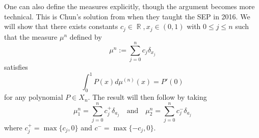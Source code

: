 \documentclass[answers]{exam}
\DeclareMathOperator{\RR}{\mathbb{R}}
\begin{document}
\begin{questions}
\begin{parts}
\begin{solution}
	One can also define the measures explicitly, though the argument becomes more technical. This is Chun's solution from when they taught the SEP in 2016. We will show that there exists constants $c_{j} \in \RR, x_{j}\in (0,1)$ with $0\leq j\leq n$ such that the measure $\mu^{n}$ defined by
  \begin{equation}\label{eq:mu-form}
    \mu^{n}:= \sum_{j=0}^{n}c_{j}\delta_{x_{j}}
  \end{equation}
  satisfies
  \[ \int_0^1 P(x) d\mu^{(n)}(x) = P'(0) \]
  for any polynomial $P \in X_n$. The result will then follow by taking
  \begin{equation*}
    \mu_{1}^{n} = \sum_{j=0}^{n}c_{j}^{+}\delta_{a_{j}} \quad \text{and}\quad    \mu_{2}^{n} = \sum_{j=0}^{n}c_{j}^{-}\delta_{a_{j}}
  \end{equation*}
  where $c_{j}^{+}=\max\{c_{j},0\}$ and $c^{-}= \max\{-c_{j},0\}$.


\end{solution}
\end{parts}
\end{questions}
\end{document}
